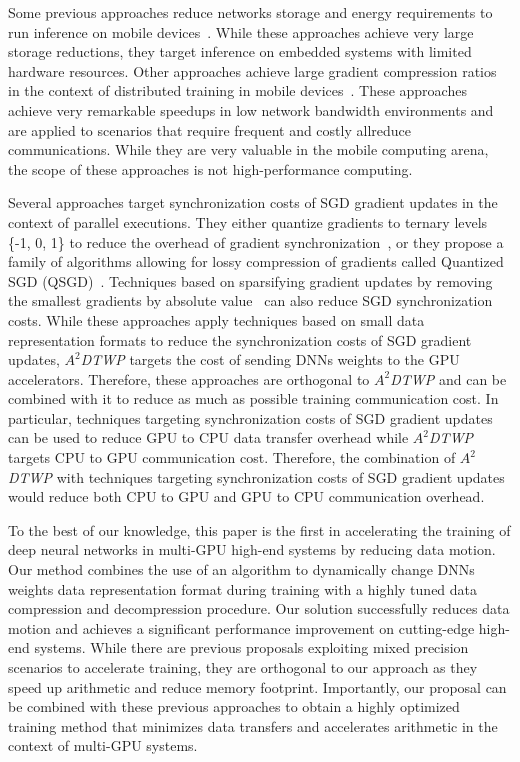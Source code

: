 Some previous approaches reduce networks storage and energy requirements to run inference  
on mobile devices~\cite{Han15}. 
While these approaches achieve very large storage reductions, they target inference on embedded systems with limited hardware resources.
Other approaches achieve large gradient compression ratios in the context of distributed training in mobile devices~\cite{Lin18}.
These approaches achieve very remarkable speedups in low network bandwidth environments and
are applied to scenarios that require frequent and costly allreduce communications.
While they are very valuable in the mobile computing arena, the scope of these approaches is not high-performance computing. 

Several approaches target synchronization costs of SGD gradient updates in the context of parallel executions.
They either quantize gradients to ternary levels \{-1, 0, 1\} to
reduce the overhead of gradient synchronization~\cite{sgd0}, or they propose a family of algorithms allowing for lossy
compression of gradients called Quantized SGD (QSGD)~\cite{sgd1}.
Techniques based on sparsifying gradient updates by removing the 
smallest gradients by absolute value~\cite{sgd2} can also reduce SGD synchronization costs.   
While these approaches apply techniques based on small data representation formats to reduce the synchronization costs of SGD gradient updates, \textit{$A^2$DTWP} targets the cost of sending DNNs weights to the GPU accelerators.
Therefore, these approaches are orthogonal to \textit{$A^2$DTWP} and can be combined with it to reduce as much as possible training communication cost. 
In particular, techniques targeting synchronization costs of SGD gradient updates can be used to reduce GPU to CPU data transfer overhead while \textit{$A^2$DTWP} targets CPU to GPU communication cost.
Therefore, the combination of \textit{$A^2$DTWP} with techniques targeting synchronization costs of SGD gradient updates would reduce both CPU to GPU and GPU to CPU communication overhead.

To the best of our knowledge, this paper is the first in accelerating the training of deep neural networks in multi-GPU high-end systems by reducing data motion.
Our method combines the use of an 
algorithm to dynamically change DNNs weights data representation format during 
training with a highly tuned data compression and decompression procedure. 
Our solution successfully reduces data motion and achieves a significant performance improvement on cutting-edge high-end systems.
While there are previous proposals exploiting mixed precision scenarios to accelerate training, they are orthogonal to our approach as they speed up arithmetic and reduce memory footprint.
Importantly, our proposal can be combined with these previous approaches to obtain a highly optimized training method that minimizes data transfers and accelerates arithmetic in the context of multi-GPU systems. 

